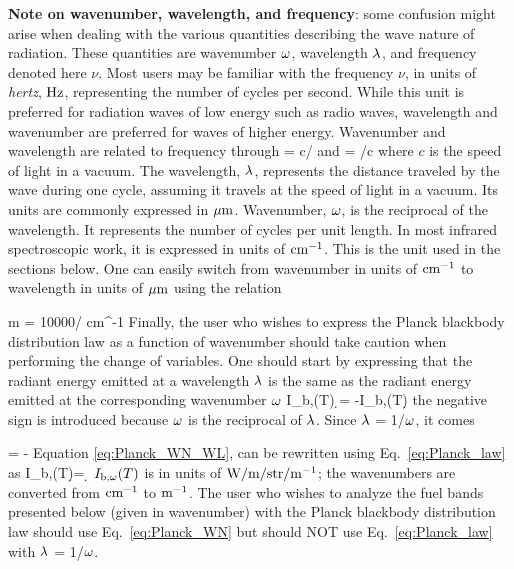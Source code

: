\textbf{Note on wavenumber, wavelength, and frequency}: some confusion might arise when dealing with the various quantities describing the wave nature of radiation. These quantities are wavenumber $\omega$, wavelength $\lambda$, and frequency denoted here $\nu$. Most users may be familiar with the frequency $\nu$, in units of \textit{hertz}, ${\rm Hz}$, representing the number of cycles per second. While this unit is preferred for radiation waves of low energy such as radio waves, wavelength and wavenumber are preferred for waves of higher energy. Wavenumber and wavelength are related to frequency through \cite{Penner:1959}
\be
 \la = c/\nu \: \: \rm{and} \: \: \om = \nu /c
\ee
where $c$ is the speed of light in a vacuum. The wavelength, $\lambda$, represents the distance traveled by the wave during one cycle, assuming it travels at the speed of light in a vacuum. Its units are commonly expressed in ${\rm \mu m}$. Wavenumber, $\omega$, is the reciprocal of the wavelength. It represents the number of cycles per unit length. In most infrared spectroscopic work, it is expressed in units of ${\rm cm^{-1}}$. This is the unit used in the sections below. One can  easily switch from wavenumber in units of ${\rm cm^{-1}}$ to wavelength in units of ${\rm \mu m}$ using the relation

\be
  \la \; {\rm \mu m}  \; = 10000/\om \; \; {\rm cm^{-1}}
\ee
Finally, the user who wishes to express the Planck blackbody distribution law
as a function of wavenumber should take caution when performing the change of variables. One should start by expressing that the radiant energy emitted
at a wavelength $\lambda$ is the same as the radiant energy emitted at the corresponding wavenumber $\omega$ \cite{Tien:1968}
\be \label{eq:Planck_WN_WL}
I_{\rm b,\la}(T) \d \la = -I_{\rm b,\om}(T)\d \om
\ee
the negative sign is introduced because $\omega$ is the reciprocal of $\lambda$.
Since $\lambda$ = 1/$\omega$, it comes

\be
\dfrac{\d \la}{\d \om} = -
\ee
Equation \ref{eq:Planck_WN_WL},
can be rewritten using Eq.~\ref{eq:Planck_law} as
\be\label{eq:Planck_WN}
  I_{\rm b,\om}(T)\d \om = \d \om
\ee
$I_{\rm b,\omega}(T)$ is in units of $\rm{W/m/str/m^{-1}}$; the wavenumbers are converted from $\rm{cm^{-1}}$ to $\rm{m^{-1}}$.
The user who wishes to analyze the fuel bands presented below (given in wavenumber) with the Planck blackbody distribution law should use Eq.~\ref{eq:Planck_WN} but should NOT use Eq.~\ref{eq:Planck_law} with $\lambda$ = 1/$\omega$.


